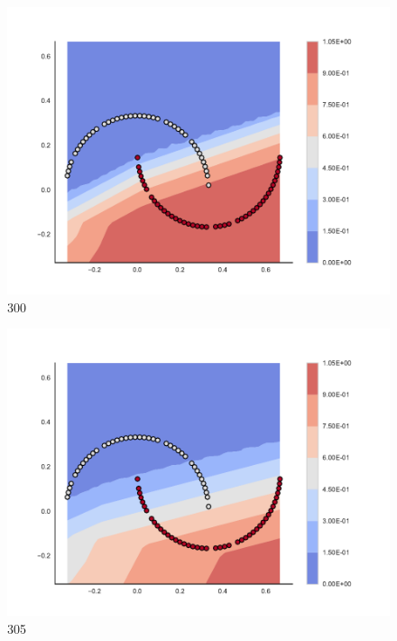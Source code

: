 \begin{subfigure}[b]{0.09\textwidth}
    \includegraphics[clip, trim=2.35cm 1.75cm 4.5cm 0cm,width=\textwidth]{img/convergence/300.pdf}
    \caption{300}
    \label{fig:convergence_300}
\end{subfigure}
%
\begin{subfigure}[b]{0.09\textwidth}
    \includegraphics[clip, trim=2.35cm 1.75cm 4.5cm 0cm,width=\textwidth]{img/convergence/305.pdf}
    \caption{305}
    \label{fig:convergence_305}
\end{subfigure}
%
